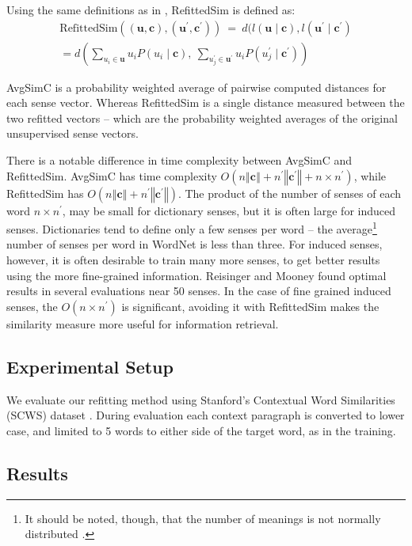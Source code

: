 \documentclass{article}
\def\parencite{\cite}
\renewcommand{\c}{\mathbf{c}}
\renewcommand{\u}{\mathbf{u}}
\begin{document}
Using the same definitions as in , RefittedSim is defined as:
\begin{multline} \label{eq:refittedsim}
\mathrm{RefittedSim}((\u,\c),(\u^{\prime},\c^{\prime}))
\:=\: d(l(\u \mid \c), l(\u^\prime \mid \c^\prime)\\
= d\left(
\sum_{u_{i}\in\u}u_{i}P(u_{i}\mid\c),\:
\sum_{u_{j}^{\prime}\in\u^{\prime}}u_{i}P(u_{j}^{\prime}\mid\c^{\prime})\right)
\end{multline}

AvgSimC is a probability weighted average of pairwise computed distances for each sense vector.
Whereas RefittedSim is a single distance measured between the two refitted vectors -- which are the probability weighted averages of the original unsupervised sense vectors.


There is a notable difference in time complexity between AvgSimC and RefittedSim.
AvgSimC has time complexity $O(n\left\Vert \c\right\Vert +n^{\prime}\left\Vert \c^{\prime}\right\Vert +n\times n^{\prime})$,
while RefittedSim has $O(n\left\Vert \c\right\Vert +n^{\prime}\left\Vert \c^{\prime}\right\Vert)$.
The product of the number of senses of each word $n \times n^\prime$, may be small for dictionary senses, but it is often large for induced senses. Dictionaries tend to define only a few senses per word -- the average\footnote{It should be noted, though, that the number of meanings is not normally distributed \parencite{zipf1945meaning}.} number of senses per word in WordNet is less than three\parencite{miller1995wordnet}.
For induced senses, however, it is often desirable to train many more senses, to get better results using the more fine-grained information.
Reisinger and Mooney  found optimal results in several evaluations near 50 senses.
In the case of fine grained induced senses, the $O(n \times n^\prime)$ is significant, avoiding it with RefittedSim makes the similarity measure more useful for information retrieval.

\subsection{Experimental Setup}
We evaluate our refitting method using Stanford's Contextual Word Similarities (SCWS) dataset \parencite{Huang2012}.
During evaluation each context paragraph is converted to lower case, and limited to 5 words to either side of the target word, as in the training.


\subsection{Results}
\end{document}
